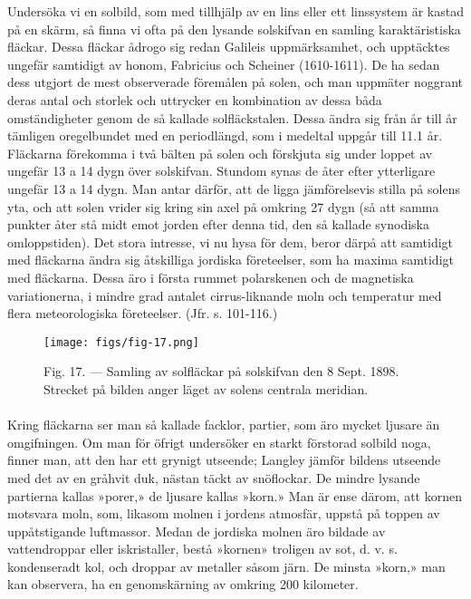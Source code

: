 \documentclass[a4paper, 12pt, oneside, swedish]{article}
\begin{document}
Undersöka vi en solbild, som med tillhjälp av en lins eller ett linssystem är kastad på en skärm, så finna vi ofta på den lysande solskifvan en samling karaktäristiska fläckar. Dessa fläckar ådrogo sig redan Galileis uppmärksamhet, och upptäcktes ungefär samtidigt av honom, Fabricius och Scheiner (1610-1611). De ha sedan dess utgjort de mest observerade föremålen på solen, och man uppmäter noggrant deras antal och storlek och uttrycker en kombination av dessa båda omständigheter genom de så kallade solfläckstalen. Dessa ändra sig från år till år tämligen oregelbundet med en periodlängd, som i medeltal uppgår till 11.1 år. Fläckarna förekomma i två bälten på solen och förskjuta sig under loppet av ungefär 13 a 14 dygn över solskifvan. Stundom synas de åter efter ytterligare ungefär 13 a 14 dygn. Man antar därför, att de ligga jämförelsevis stilla på solens yta, och att solen vrider sig kring sin axel på omkring 27 dygn (så att samma punkter åter stå midt emot jorden efter denna tid, den så kallade synodiska omloppstiden). Det stora intresse, vi nu hysa för dem, beror därpå att samtidigt med fläckarna ändra sig åtskilliga jordiska företeelser, som ha maxima samtidigt med fläckarna. Dessa äro i första rummet polarskenen och de magnetiska variationerna, i mindre grad antalet cirrus-liknande moln och temperatur med flera meteorologiska företeelser. (Jfr. s. 101-116.)

\begin{figure}[H]
\centering
\texttt{[image: figs/fig-17.png]}
\caption{Fig. 17. --- Samling av solfläckar på solskifvan den 8 Sept. 1898. Strecket på bilden anger läget av solens centrala meridian.}
\end{figure}
\paragraph{}
Kring fläckarna ser man så kallade facklor, partier, som äro mycket ljusare än omgifningen. Om man för öfrigt undersöker en starkt förstorad solbild noga, finner man, att den har ett grynigt utseende; Langley jämför bildens utseende med det av en gråhvit duk, nästan täckt av snöflockar. De mindre lysande partierna kallas »porer,» de ljusare kallas »korn.» Man är ense därom, att kornen motsvara moln, som, likasom molnen i jordens atmosfär, uppstå på toppen av uppåtstigande luftmassor. Medan de jordiska molnen äro bildade av vattendroppar eller iskristaller, bestå »kornen» troligen av sot, d. v. s. kondenseradt kol, och droppar av metaller såsom järn. De minsta »korn,» man kan observera, ha en genomskärning av omkring 200 kilometer.
\end{document}
